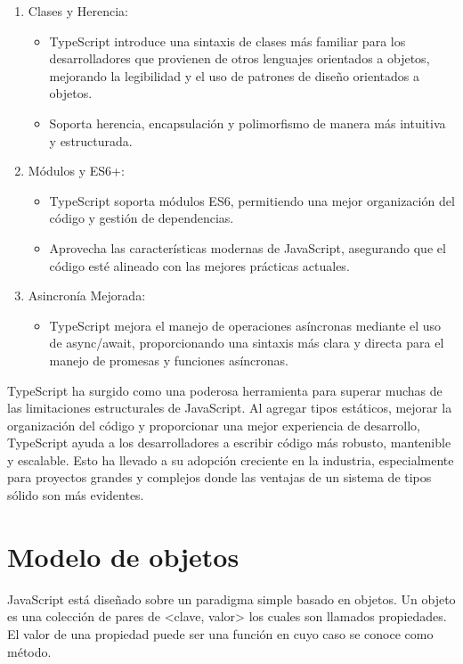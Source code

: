 \documentclass{article}
\begin{document}
\begin{enumerate}
    \item Clases y Herencia:
          \begin{itemize}
              \item TypeScript introduce una sintaxis de clases más familiar para los desarrolladores que provienen
                    de otros lenguajes orientados a objetos, mejorando la legibilidad y el uso de patrones de diseño
                    orientados a objetos.
              \item  Soporta herencia, encapsulación y polimorfismo de manera más intuitiva y estructurada.
          \end{itemize}
    \item Módulos y ES6+:
          \begin{itemize}
              \item TypeScript soporta módulos ES6, permitiendo una mejor organización del código y gestión de
                    dependencias.
              \item Aprovecha las características modernas de JavaScript, asegurando que el código esté alineado con
                    las mejores prácticas actuales.
          \end{itemize}
    \item Asincronía Mejorada:
          \begin{itemize}
              \item TypeScript mejora el manejo de operaciones asíncronas mediante el uso de async/await,
                    proporcionando una sintaxis más clara y directa para el manejo de promesas y funciones asíncronas.
          \end{itemize}
\end{enumerate}

TypeScript ha surgido como una poderosa herramienta para superar muchas de las limitaciones estructurales de
JavaScript. Al agregar tipos estáticos, mejorar la organización del código y proporcionar una mejor experiencia
de desarrollo, TypeScript ayuda a los desarrolladores a escribir código más robusto, mantenible y escalable. Esto
ha llevado a su adopción creciente en la industria, especialmente para proyectos grandes y complejos donde las
ventajas de un sistema de tipos sólido son más evidentes.

\section{Modelo de objetos}

JavaScript está diseñado sobre un paradigma simple basado en objetos. Un objeto es una colección de pares de
<clave, valor> los cuales son llamados propiedades. El valor de una propiedad puede ser una función en cuyo caso
se conoce como método.
\end{document}
